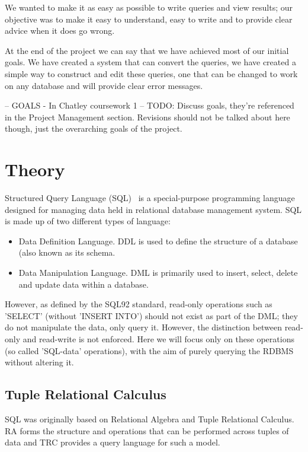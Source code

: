 \documentclass[a4paper, 11pt]{article}
\begin{document}
We wanted to make it as easy as possible to write queries and view results;
our objective was to make it easy to understand, easy to write and to
provide clear advice when it does go wrong.

At the end of the project we can say that we have achieved most of our initial 
goals. We have created a system that can convert the queries, we have created
a simple way to construct and edit these queries, one that can be changed to 
work on any database and will provide clear error messages.

  -- GOALS - In Chatley coursework 1 --
  TODO: Discuss goals, they're referenced in the Project Management
  section. Revisions should not be talked about here though, just the
  overarching goals of the project.

\section{Theory}

  Structured Query Language (SQL)~\cite{wiki:SQL} is a special-purpose
  programming language designed for managing data held in relational database
  management system. SQL is made up of two different types of language:

  \begin{itemize}
      \item
        Data Definition Language. DDL is used to define the structure of a
        database (also known as its schema.
      \item
        Data Manipulation Language. DML is primarily used to insert, select,
        delete and update data within a database.
  \end{itemize}

  However, as defined by the SQL92 standard\cite{isoSQL}, read-only operations
  such as 'SELECT' (without 'INSERT INTO') should not exist as part of the DML;
  they do not manipulate the data, only query it. However, the distinction
  between read-only and read-write is not enforced. Here we will focus only on
  these operations (so called 'SQL-data' operations), with the aim of purely
  querying the RDBMS without altering it.

  \subsection{Tuple Relational Calculus}
    SQL was originally based on Relational Algebra and Tuple Relational
    Calculus. RA forms the structure and operations that can be performed
    across tuples of data and TRC provides a query language for such a model.
\end{document}
